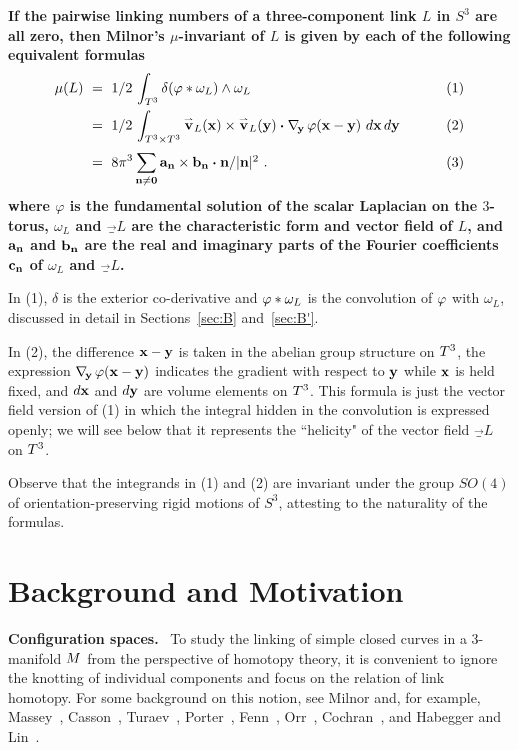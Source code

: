 {%
\begin{theorem}\label{thm:B}
\textbf{\boldmath If the pairwise linking numbers of a three-component link $L$ in $S^3$ are all zero, then Milnor's $\mu$-invariant of $L$ is given by each of the following equivalent formulas
$$
\begin{aligned}
\mu(L) \ &= \  1/2\, \int_{T^3} \delta(\varphi*\omega_L) \wedge \omega_L \ & \qquad (1) \\
\ &= \ 1/2\, \int_{\tor\times\tor} \vec_L(\x) \times \vec_L(\y) \dtew \nabla_{\!\y}\, \varphi(\x - \y)\ d\x\, d\y \ & \qquad (2) \\
\ & = \  8\pi^3 \sum_{\n\ne\zero} \textstyle \a_\n\times \b_\n\dtew \n/\|\n\|^2\ . & \qquad (3)
\end{aligned}
$$
where $\varphi$ is the fundamental solution of the scalar Laplacian on the $3$-torus, $\omega_L$ and $\vec_L$ are the characteristic form and vector field of $L$, and $\textup{\bf a}_{\textup{\bf n}}$ and $\textup{\bf b}_{\textup{\bf n}}$ are the real and imaginary parts of the Fourier coefficients $\textup{\bf c}_{\textup{\bf n}}$ of $\omega_L$ and $\vec_L$.}
\end{theorem}


 In (1), $\delta$ is the exterior co-derivative and $\varphi*\omega_L$ is the convolution of $\varphi$ with $\omega_L$, discussed in detail in Sections~\ref{sec:B} and~\ref{sec:B'}. 

In (2), the difference $\textup{\bf x}-\textup{\bf y}$ is taken in the abelian group structure on $T^3$, the expression $\nabla_{\!\textup{\bf y}}\, \varphi(\textup{\bf x} - \textup{\bf y})$ indicates the gradient with respect to $\textup{\bf y}$ while $\textup{\bf x}$ is held fixed, and $d\textup{\bf x}$ and $d\textup{\bf y}$ are volume elements on $T^3$.  This formula is just the vector field version of (1) in which the integral hidden in the convolution is expressed openly; we will see below that it represents the ``helicity" of the vector field $\vec_L$ on $T^3$.  

Observe that the integrands in (1) and (2) are invariant under the group $SO(4)$ of orientation-preserving rigid motions of $S^3$, attesting to the naturality of the formulas. 


\part{Background and Motivation} 


{\bf Configuration spaces.} \ To study the linking of simple closed curves in a $3$-manifold $M$ from the perspective of homotopy theory, it is convenient to ignore the knotting of individual components and focus on the relation of {\itb link homotopy}.  For some background on this notion, see Milnor \cite{Milnor54, Milnor57} and, for example, Massey~\cite{Massey68}, Casson~\cite{Casson75}, Turaev~\cite{Turaev76}, Porter~\cite{Porter}, Fenn~\cite{Fenn83}, Orr~\cite{Orr}, Cochran~\cite{Cochran}, and Habegger and Lin~\cite{HabeggerLin}.


}
